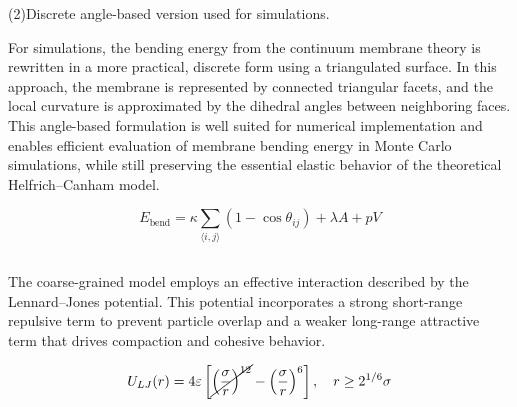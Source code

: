 \documentclass[12pt]{article}
\begin{document}
\begin{flushleft}
\indent\indent (2)Discrete angle-based version used for simulations.

For simulations, the bending energy from the continuum membrane theory is rewritten in a more practical, discrete form using a triangulated surface. In this approach, the membrane is represented by connected triangular facets, and the local curvature is approximated by the dihedral angles between neighboring faces. This angle-based formulation is well suited for numerical implementation and enables efficient evaluation of membrane bending energy in Monte Carlo simulations, while still preserving the essential elastic behavior of the theoretical Helfrich–Canham model.

\begin{equation}
E_{\text{bend}} = \kappa \sum_{\langle i,j \rangle} \left(1 - \cos \theta_{ij} \right)+\lambda A+p V
\end{equation}

 \subsection*{}
       


          \indent The coarse-grained model employs an effective interaction described by the Lennard–Jones potential. This potential incorporates a strong short-range repulsive term to prevent particle overlap and a weaker long-range attractive term that drives compaction and cohesive behavior.

\begin{equation}
U_{LJ}(r) = 4\varepsilon \left[ \cancel{\left( \frac{\sigma}{r} \right)^{12}}
- \left( \frac{\sigma}{r} \right)^{6} \right], \quad r \ge 2^{1/6}\sigma
\end{equation}
    


\end{flushleft}
\end{document}
